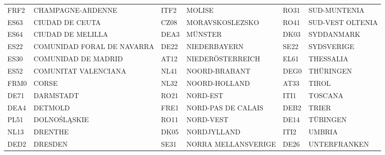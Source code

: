\documentclass[a4paper,11pt,oneside]{article}
\begin{document}
\begin{table}
{\begin{tabular}{llllll}
FRF2                & CHAMPAGNE-ARDENNE           & ITF2                & MOLISE                     & RO31                & SUD-MUNTENIA                                                \\
ES63                & CIUDAD DE CEUTA             & CZ08                & MORAVSKOSLEZSKO            & RO41                & SUD-VEST OLTENIA                                            \\
ES64                & CIUDAD DE MELILLA           & DEA3                & MÜNSTER                    & DK03                & SYDDANMARK                                                  \\
ES22                & COMUNIDAD FORAL DE NAVARRA  & DE22                & NIEDERBAYERN               & SE22                & SYDSVERIGE                                                  \\
ES30                & COMUNIDAD DE MADRID         & AT12                & NIEDERÖSTERREICH           & EL61                & THESSALIA                                                   \\
ES52                & COMUNITAT VALENCIANA        & NL41                & NOORD-BRABANT              & DEG0                & THÜRINGEN                                                   \\
FRM0                & CORSE                       & NL32                & NOORD-HOLLAND              & AT33                & TIROL                                                       \\
DE71                & DARMSTADT                   & RO21                & NORD-EST                   & ITI1                & TOSCANA                                                     \\
DEA4                & DETMOLD                     & FRE1                & NORD-PAS DE CALAIS         & DEB2                & TRIER                                                       \\
PL51                & DOLNOŚLĄSKIE                & RO11                & NORD-VEST                  & DE14                & TÜBINGEN                                                    \\
NL13                & DRENTHE                     & DK05                & NORDJYLLAND                & ITI2                & UMBRIA                                                      \\
DED2                & DRESDEN                     & SE31                & NORRA MELLANSVERIGE        & DE26                & UNTERFRANKEN                                                \\

\end{tabular}}
\end{table}
\end{document}
